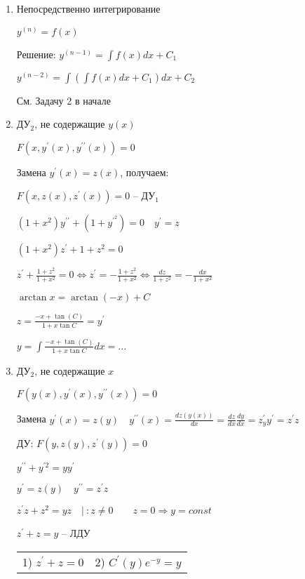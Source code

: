 \documentclass[12pt]{article}
\begin{document}
    \begin{enumerate}[label*=\arabic** ]
        \item Непосредственно интегрирование

        $y^{(n)} = f(x)$

        Решение: $y^{(n - 1)} = \int f(x) dx + C_1$

        $y^{(n - 2)} = \int \left(\int f(x) dx + C_1\right) dx + C_2$

        \Ex См. Задачу 2 в начале

        \item ДУ$_2$, не содержащие $y(x)$

        $F(x, y^\prime(x), y^{\prime\prime}(x)) = 0$

        Замена $y^\prime(x) = z(x)$, получаем:

        $F(x, z(x), z^\prime(x)) = 0$ -- ДУ$_1$

        \Ex $(1 + x^2)y^{\prime\prime} + (1 + y^\prime^2) = 0 \quad y^\prime = z$

        $(1 + x^2)z^\prime + 1 + z^2 = 0$

        $z^\prime + \frac{1 + z^2}{1 + x^2} = 0 \Longleftrightarrow z^\prime = -\frac{1 + z^2}{1 + x^2} \Longleftrightarrow \frac{dz}{1 + z^2} = -\frac{dx}{1 + x^2}$

        $\arctan x = \arctan(-x) + C$

        $z = \frac{-x + \tan(C)}{1 + x \tan C} = y^\prime$

        $y = \int \frac{-x + \tan(C)}{1 + x \tan C} dx = \dots $

        \item ДУ$_2$, не содержащие $x$

        $F(y(x), y^\prime(x), y^{\prime\prime}(x)) = 0$

        Замена $y^\prime(x) = z(y) \quad y^{\prime\prime}(x) = \frac{dz(y(x))}{dx} = \frac{dz}{dx} \frac{dy}{dx} = z^\prime_y y^\prime = z^\prime z$

        ДУ: $F(y, z(y), z^\prime(y)) = 0$

        \Ex $y^{\prime\prime} + y^{\prime 2} = yy^\prime$

        $y^\prime = z(y) \quad y^{\prime\prime} = z^\prime z$

        $z^\prime z + z^2 = yz \quad | \ : z \neq 0 \quad\quad z = 0 \Longrightarrow y = const$

        $z^\prime + z = y$ -- ЛДУ

        \begin{tabular}{p{5cm}p{10cm}}
            1) $z^\prime + z = 0$ & 2) $C^\prime (y) e^{-y} = y$                                                                                              \\


\end{tabular}
\end{enumerate}
\end{document}

